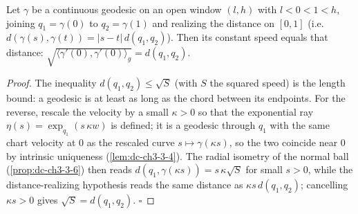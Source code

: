 \begin{lemma}
  \label{lem:dc-ch3-4-2-speed-dist}
  \leanok
  Let $\gamma$ be a continuous geodesic on an open window $(l,h)$ with $l<0<1<h$, joining
  $q_1=\gamma(0)$ to $q_2=\gamma(1)$ and realizing the distance on $[0,1]$
  (i.e. $d(\gamma(s),\gamma(t))=|s-t|\,d(q_1,q_2)$). Then its constant speed equals that distance:
  $\sqrt{\langle\gamma'(0),\gamma'(0)\rangle_g}=d(q_1,q_2)$.
\end{lemma}
\begin{proof}
  \leanok
  The inequality $d(q_1,q_2)\le\sqrt{S}$ (with $S$ the squared speed) is the length bound: a geodesic
  is at least as long as the chord between its endpoints. For the reverse, rescale the velocity by a
  small $\kappa>0$ so that the exponential ray $\eta(s)=\exp_{q_1}(s\,\kappa w)$ is defined; it is a
  geodesic through $q_1$ with the same chart velocity at $0$ as the rescaled curve
  $s\mapsto\gamma(\kappa s)$, so the two coincide near $0$ by intrinsic uniqueness
  (\cref{lem:dc-ch3-3-4}). The radial isometry of the normal ball (\cref{prop:dc-ch3-3-6}) then reads
  $d(q_1,\gamma(\kappa s))=s\,\kappa\sqrt{S}$ for small $s>0$, while the distance-realizing hypothesis
  reads the same distance as $\kappa s\,d(q_1,q_2)$; cancelling $\kappa s>0$ gives
  $\sqrt{S}=d(q_1,q_2)$. $\square$
\end{proof}

